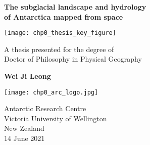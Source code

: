 \begin{titlepage}
  \begin{center}

    \LARGE
    \textbf{
      The subglacial landscape and hydrology \\
      of Antarctica mapped from space
    }

    \texttt{[image: chp0\_thesis\_key\_figure]}

    \Large
    A thesis presented for the degree of\\
    Doctor of Philosophy in Physical Geography

    \vspace{0.8cm}

    \textbf{Wei Ji Leong}

    \texttt{[image: chp0\_arc\_logo.jpg]}

    \Large
    Antarctic Research Centre\\
    Victoria University of Wellington\\
    New Zealand\\
    14 June 2021

  \end{center}
\end{titlepage}
